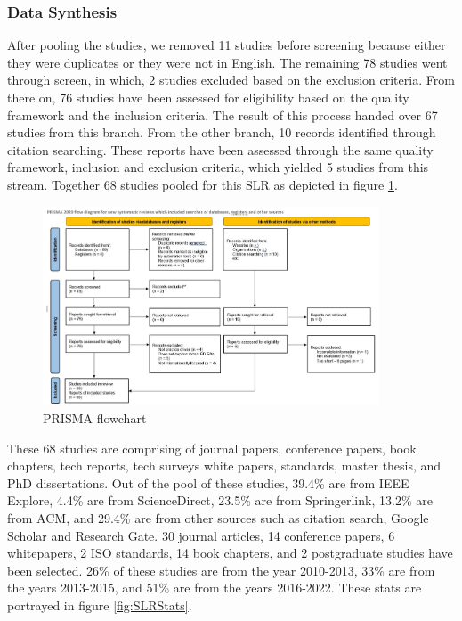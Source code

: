 \documentclass[review]{elsarticle}
\begin{document}
\subsubsection{Data Synthesis}

After pooling the studies, we removed 11 studies before screening because either they were duplicates or they were not in English. The remaining 78 studies went through screen, in which, 2 studies excluded based on the exclusion criteria. From there on, 76 studies have been assessed for eligibility based on the quality framework and the inclusion criteria. The result of this process handed over 67 studies from this branch. From the other branch, 10 records identified through citation searching. These reports have been assessed through the same quality framework, inclusion and exclusion criteria, which yielded 5 studies from this stream. Together 68 studies pooled for this SLR as depicted in figure \ref{fig:PRISMA}.

\begin{figure}[h!]
    \centering
    \includegraphics[width=10cm]{PRISMA.JPG}
    \caption{PRISMA flowchart}
    \label{fig:PRISMA}
\end{figure}


These 68 studies are comprising of journal papers, conference papers, book chapters, tech reports, tech surveys white papers, standards, master thesis, and PhD dissertations. Out of the pool of these studies, 39.4\% are from IEEE Explore, 4.4\% are from ScienceDirect, 23.5\% are from Springerlink, 13.2\% are from ACM, and 29.4\% are from other sources such as citation search, Google Scholar and Research Gate. 30 journal articles, 14 conference papers, 6 whitepapers, 2 ISO standards, 14 book chapters, and 2 postgraduate studies have been selected. 26\% of these studies are from the year 2010-2013, 33\% are from the years 2013-2015, and 51\% are from the years 2016-2022. These stats are portrayed in figure \ref{fig:SLRStats}. 
\end{document}
